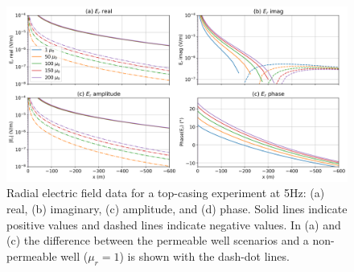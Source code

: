\begin{figure}[H]
    \begin{center}
    \includegraphics[width=\columnwidth]{figures/e-fields-fdem.png}
    \end{center}
\caption{
    Radial electric field data for a top-casing experiment at 5Hz: (a) real, (b) imaginary, (c) amplitude, and (d) phase. Solid lines indicate positive values and dashed lines indicate negative values. In (a) and (c) the difference between the permeable well scenarios and a non-permeable well ($\mu_r=1$) is shown with the dash-dot lines.
}
\label{fig:e-fields-fdem}
\end{figure}



